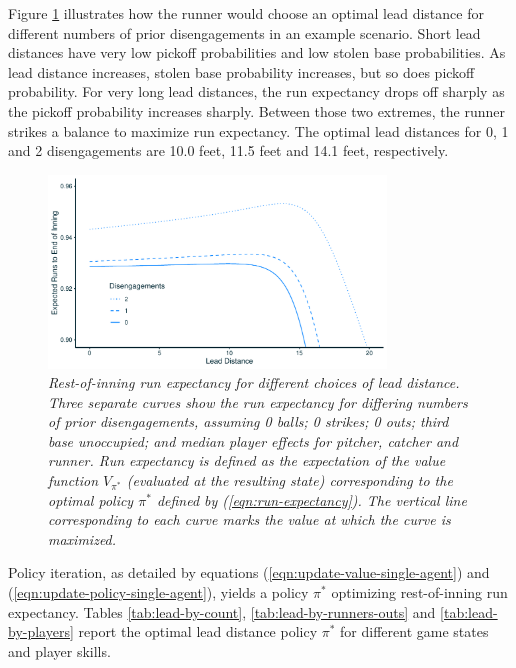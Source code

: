 \documentclass{article}
\begin{document}
      Figure \ref{fig:finding-optimal-lead} illustrates how the runner would choose an optimal lead distance for different numbers of prior disengagements in an example scenario. Short lead distances have very low pickoff probabilities and low stolen base probabilities. As lead distance increases, stolen base probability increases, but so does pickoff probability. For very long lead distances, the run expectancy drops off sharply as the pickoff probability increases sharply. Between those two extremes, the runner strikes a balance to maximize run expectancy. The optimal lead distances for 0, 1 and 2 disengagements are 10.0 feet, 11.5 feet and 14.1 feet, respectively.
      
      \begin{figure}
        \centering
        \includegraphics[width = 0.8\textwidth]{../../output/figures/finding_optimal_lead_light.pdf}
        \caption{
          \it Rest-of-inning run expectancy for different choices of lead distance. Three separate curves show the run expectancy for differing numbers of prior disengagements, assuming 0 balls; 0 strikes; 0 outs; third base unoccupied; and median player effects for pitcher, catcher and runner. Run expectancy is defined as the expectation of the value function $V_{\pi^*}$ (evaluated at the resulting state) corresponding to the optimal policy $\pi^*$ defined by (\ref{eqn:run-expectancy}). The vertical line corresponding to each curve marks the value at which the curve is maximized.
        }
        \label{fig:finding-optimal-lead}
      \end{figure}

      Policy iteration, as detailed by equations (\ref{eqn:update-value-single-agent}) and (\ref{eqn:update-policy-single-agent}), yields a policy $\pi^*$ optimizing rest-of-inning run expectancy. Tables \ref{tab:lead-by-count}, \ref{tab:lead-by-runners-outs} and \ref{tab:lead-by-players} report the optimal lead distance policy $\pi^*$ for different game states and player skills.
    
\end{document}
